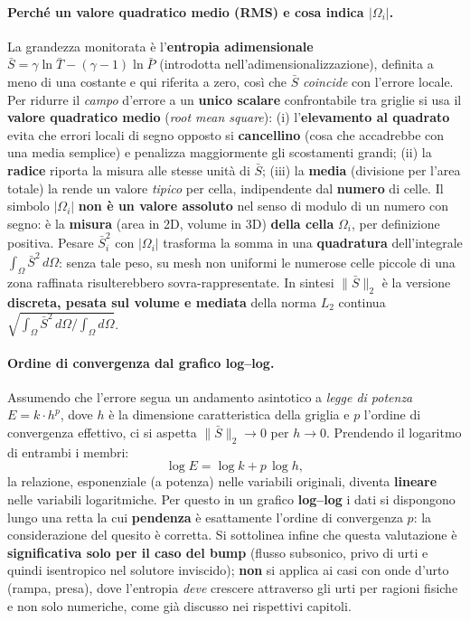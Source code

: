 \paragraph{Perché un valore quadratico medio (RMS) e cosa indica $|\Omega_i|$.}
La grandezza monitorata è l'\textbf{entropia adimensionale} $\bar S = \gamma\ln\bar T - (\gamma-1)\ln\bar P$
(introdotta nell'adimensionalizzazione), definita a meno di una costante e qui riferita a zero, così
che $\bar S$ \emph{coincide} con l'errore locale. Per ridurre il \emph{campo} d'errore a un \textbf{unico scalare} confrontabile tra griglie si
usa il \textbf{valore quadratico medio} (\emph{root mean square}): (i) l'\textbf{elevamento al
quadrato} evita che errori locali di segno opposto si \textbf{cancellino} (cosa che accadrebbe con
una media semplice) e penalizza maggiormente gli scostamenti grandi; (ii) la \textbf{radice} riporta
la misura alle stesse unità di $\bar S$; (iii) la \textbf{media} (divisione per l'area totale) la
rende un valore \emph{tipico} per cella, indipendente dal \textbf{numero} di celle. Il simbolo
$|\Omega_i|$ \textbf{non è un valore assoluto} nel senso di modulo di un numero con segno: è la
\textbf{misura} (area in 2D, volume in 3D) \textbf{della cella} $\Omega_i$, per definizione positiva.
Pesare $\bar S_i^2$ con $|\Omega_i|$ trasforma la somma in una \textbf{quadratura} dell'integrale
$\int_\Omega \bar S^2\,d\Omega$: senza tale peso, su mesh non uniformi le numerose celle piccole di
una zona raffinata risulterebbero sovra-rappresentate. In sintesi $\|\bar S\|_2$ è la versione
\textbf{discreta, pesata sul volume e mediata} della norma $L_2$ continua
$\sqrt{\int_\Omega \bar S^2\,d\Omega \big/ \int_\Omega d\Omega}$.

\paragraph{Ordine di convergenza dal grafico log--log.}
Assumendo che l'errore segua un andamento asintotico a \emph{legge di potenza}
$E = k \cdot h^p$, dove $h$ è la dimensione caratteristica della griglia e $p$ l'ordine
di convergenza effettivo, ci si aspetta $\|\bar{S}\|_2 \to 0$ per $h \to 0$. Prendendo
il logaritmo di entrambi i membri:
\begin{equation}
  \log E = \log k + p \,\log h ,
\end{equation}
la relazione, esponenziale (a potenza) nelle variabili originali, diventa
\textbf{lineare} nelle variabili logaritmiche. Per questo in un grafico \textbf{log--log}
i dati si dispongono lungo una retta la cui \textbf{pendenza} è esattamente l'ordine di
convergenza $p$: la considerazione del quesito è corretta.
Si sottolinea infine che questa valutazione è \textbf{significativa solo per il caso del
bump} (flusso subsonico, privo di urti e quindi isentropico nel solutore inviscido);
\textbf{non} si applica ai casi con onde d'urto (rampa, presa), dove l'entropia
\emph{deve} crescere attraverso gli urti per ragioni fisiche e non solo numeriche, come
già discusso nei rispettivi capitoli.

